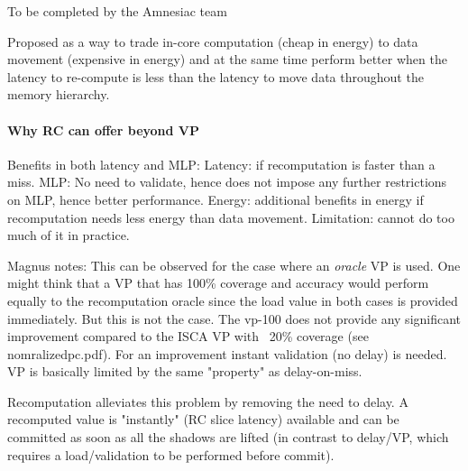{\color{red} To be completed by the Amnesiac team}

{\color{blue} Proposed as a way to trade in-core computation (cheap in energy) to data movement (expensive in energy) and at the same time perform better when the latency to re-compute is less than the latency to move data throughout the memory hierarchy.
\paragraph{Why RC can offer beyond VP}
Benefits in both latency and MLP: Latency: if recomputation is faster than a miss. MLP: No need to validate, hence does not impose any further restrictions on MLP, hence better performance. Energy: additional benefits in energy if recomputation needs less energy than data movement. Limitation: cannot do too much of it in practice. }

{\color{red} Magnus notes:
This can be observed for the case where an \emph{oracle} VP is used. One might think that a VP that has 100\% coverage and accuracy would perform equally to the recomputation oracle since the load value in both cases is provided immediately. But this is not the case. The vp-100 does not provide any significant improvement compared to the ISCA VP with ~20\% coverage (see nomralizedpc.pdf). For an improvement instant validation (no delay) is needed. VP is basically limited by the same "property" as delay-on-miss.

Recomputation alleviates this problem by removing the need to delay. A recomputed value is "instantly" (RC slice latency) available and can be committed as soon as all the shadows are lifted (in contrast to delay/VP, which requires a load/validation to be performed before commit).
}



 
